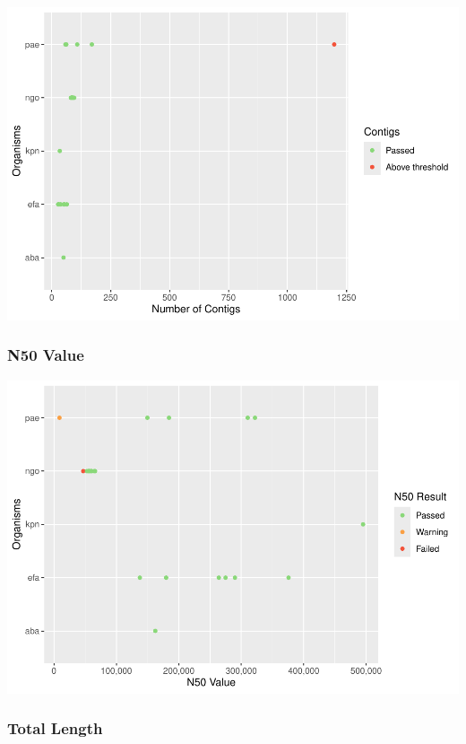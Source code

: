 \documentclass[
  a4paper,
]{article}
\begin{document}
\includegraphics{qualifyr_report_2024-07-08_files/figure-latex/unnamed-chunk-1-1.pdf}

\subsubsection{N50 Value}\label{n50-value}

\includegraphics{qualifyr_report_2024-07-08_files/figure-latex/n50_result -1.pdf}

\subsubsection{Total Length}\label{total-length}
\end{document}
